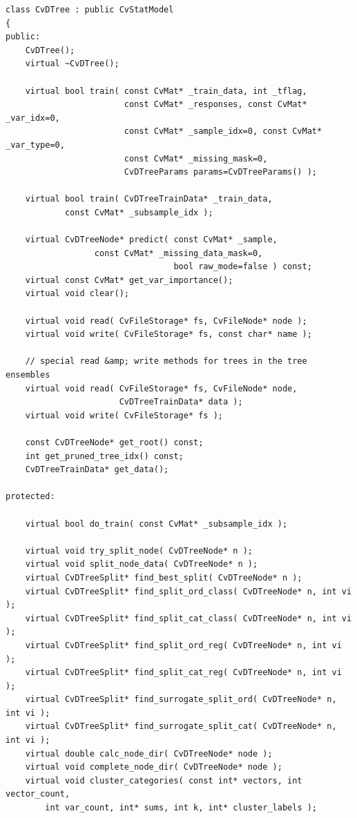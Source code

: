 \begin{lstlisting}
class CvDTree : public CvStatModel
{
public:
    CvDTree();
    virtual ~CvDTree();

    virtual bool train( const CvMat* _train_data, int _tflag,
                        const CvMat* _responses, const CvMat* _var_idx=0,
                        const CvMat* _sample_idx=0, const CvMat* _var_type=0,
                        const CvMat* _missing_mask=0,
                        CvDTreeParams params=CvDTreeParams() );

    virtual bool train( CvDTreeTrainData* _train_data, 
			const CvMat* _subsample_idx );

    virtual CvDTreeNode* predict( const CvMat* _sample, 
				  const CvMat* _missing_data_mask=0,
                                  bool raw_mode=false ) const;
    virtual const CvMat* get_var_importance();
    virtual void clear();

    virtual void read( CvFileStorage* fs, CvFileNode* node );
    virtual void write( CvFileStorage* fs, const char* name );

    // special read &amp; write methods for trees in the tree ensembles
    virtual void read( CvFileStorage* fs, CvFileNode* node,
                       CvDTreeTrainData* data );
    virtual void write( CvFileStorage* fs );

    const CvDTreeNode* get_root() const;
    int get_pruned_tree_idx() const;
    CvDTreeTrainData* get_data();

protected:

    virtual bool do_train( const CvMat* _subsample_idx );

    virtual void try_split_node( CvDTreeNode* n );
    virtual void split_node_data( CvDTreeNode* n );
    virtual CvDTreeSplit* find_best_split( CvDTreeNode* n );
    virtual CvDTreeSplit* find_split_ord_class( CvDTreeNode* n, int vi );
    virtual CvDTreeSplit* find_split_cat_class( CvDTreeNode* n, int vi );
    virtual CvDTreeSplit* find_split_ord_reg( CvDTreeNode* n, int vi );
    virtual CvDTreeSplit* find_split_cat_reg( CvDTreeNode* n, int vi );
    virtual CvDTreeSplit* find_surrogate_split_ord( CvDTreeNode* n, int vi );
    virtual CvDTreeSplit* find_surrogate_split_cat( CvDTreeNode* n, int vi );
    virtual double calc_node_dir( CvDTreeNode* node );
    virtual void complete_node_dir( CvDTreeNode* node );
    virtual void cluster_categories( const int* vectors, int vector_count,
        int var_count, int* sums, int k, int* cluster_labels );


\end{lstlisting}
